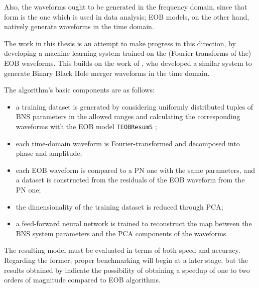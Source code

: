 \documentclass[11pt]{article}
\begin{document}
Also, the waveforms ought to be generated in the frequency domain, since that form is the one which is used in data analysis;
EOB models, on the other hand, natively generate waveforms in the time domain. 

The work in this thesis is an attempt to make progress in this direction, by developing a machine learning system trained on the (Fourier transforms of the) \ac{EOB} waveforms. 
This builds on the work of \textcite{schmidtMachineLearningGravitational2020}, who developed a similar system to generate Binary Black Hole merger waveforms in the time domain.

The algorithm's basic components are as follows:
\begin{itemize}
    \item a training dataset is generated by considering uniformly distributed tuples of \ac{BNS} parameters in the allowed ranges and calculating the corresponding waveforms with the \ac{EOB} model \texttt{TEOBResumS} \cite[]{nagarTimedomainEffectiveonebodyGravitational2018};
    \item each time-domain waveform is Fourier-transformed and decomposed into phase and amplitude;
    \item each \ac{EOB} waveform is compared to a \ac{PN} one with the same parameters, and a dataset is constructed from the residuals of the \ac{EOB} waveform from the \ac{PN} one;
    \item the dimensionality of the training dataset is reduced through \ac{PCA};
    \item a feed-forward neural network is trained to reconstruct the map between the \ac{BNS} system parameters and the \ac{PCA} components of the waveforms. 
\end{itemize}

The resulting model must be evaluated in terms of both speed and accuracy.
Regarding the former, proper benchmarking will begin at a later stage, but the results obtained by \textcite[]{schmidtMachineLearningGravitational2020} indicate the possibility of obtaining a speedup of one to two orders of magnitude compared to EOB algorithms. 
\end{document}
